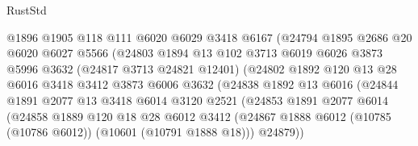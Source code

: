 \begin{lexlean}{RustStd}
\begin{coremodule}
                          @1896
                          @1905
                          @118
                          @111
                          @6020
                          @6029
                          @3418
                          @6167
                          (@24794
                            @1895
                            @2686
                            @20
                            @6020
                            @6027
                            @5566
                            (@24803
                              @1894
                              @13
                              @102
                              @3713
                              @6019
                              @6026
                              @3873
                              @5996
                              @3632
                              (@24817 @3713 @24821 @12401)
                              (@24802
                                @1892
                                @120
                                @13
                                @28
                                @6016
                                @3418
                                @3412
                                @3873
                                @6006
                                @3632
                                (@24838
                                  @1892
                                  @13
                                  @6016
                                  (@24844
                                    @1891
                                    @2077
                                    @13
                                    @3418
                                    @6014
                                    @3120
                                    @2521
                                    (@24853
                                      @1891
                                      @2077
                                      @6014
                                      (@24858
                                        @1889
                                        @120
                                        @18
                                        @28
                                        @6012
                                        @3412
                                        (@24867
                                          @1888
                                          @6012
                                          (@10785 (@10786 @6012))
                                          (@10601 (@10791 @1888 @18)))
                                        @24879))

\end{coremodule}
\end{lexlean}

